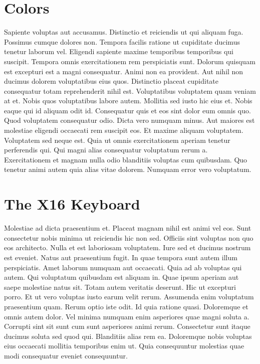 
\chapter{Colors}

Sapiente voluptas aut accusamus. Distinctio et reiciendis ut qui aliquam fuga.
Possimus cumque dolores non. Tempora facilis ratione ut cupiditate ducimus
tenetur laborum vel. Eligendi sapiente maxime temporibus temporibus qui
suscipit. Tempora omnis exercitationem rem perspiciatis sunt. Dolorum quisquam
est excepturi est a magni consequatur. Animi non ea provident. Aut nihil non
ducimus dolorem voluptatibus eius quos. Distinctio placeat cupiditate
consequatur totam reprehenderit nihil est. Voluptatibus voluptatem quam veniam
at et. Nobis quos voluptatibus labore autem. Mollitia sed iusto hic eius et.
Nobis eaque qui id aliquam odit id. Consequatur quis et eos sint dolor eum
omnis quo. Quod voluptatem consequatur odio. Dicta vero numquam minus. Aut
maiores est molestiae eligendi occaecati rem suscipit eos. Et maxime aliquam
voluptatem. Voluptatem sed neque est. Quia ut omnis exercitationem aperiam
tenetur perferendis qui. Qui magni alias consequatur voluptatum rerum a.
Exercitationem et magnam nulla odio blanditiis voluptas cum quibusdam. Quo
tenetur animi autem quia alias vitae dolorem. Numquam error vero voluptatum.


\chapter{The X16 Keyboard}

Molestiae ad dicta praesentium et. Placeat magnam nihil est animi vel eos. Sunt
consectetur nobis minima ut reiciendis hic non sed. Officiis sint voluptas non
quo eos architecto. Nulla et est laboriosam voluptatem. Iure sed et ducimus
nostrum est eveniet. Natus aut praesentium fugit. In quae tempora sunt autem
illum perspiciatis. Amet laborum numquam aut occaecati. Quia ad ab voluptas qui
autem. Qui voluptatum quibusdam est aliquam in. Quae ipsum aperiam aut saepe
molestiae natus sit. Totam autem veritatis deserunt. Hic ut excepturi porro. Et
ut vero voluptas iusto earum velit rerum. Assumenda enim voluptatum praesentium
quam. Rerum optio iste odit. Id quia ratione quasi. Doloremque et omnis autem
dolor. Vel minima numquam enim asperiores quae magni soluta a. Corrupti sint
sit sunt cum sunt asperiores animi rerum. Consectetur sunt itaque ducimus
soluta sed quod qui. Blanditiis alias rem ea. Doloremque nobis voluptas eius
occaecati mollitia temporibus enim ut. Quia consequuntur molestias quae modi
consequatur eveniet consequuntur.

